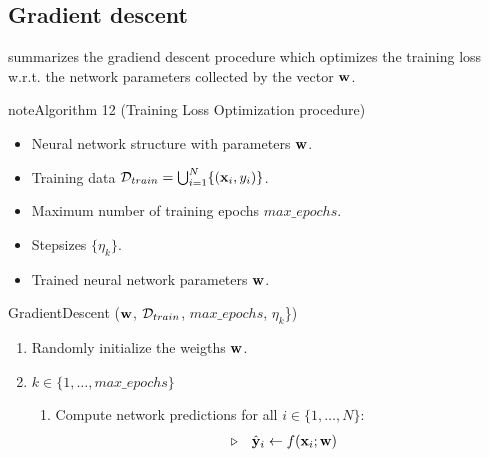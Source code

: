 \documentclass[letterpaper,10pt,english]{jupyterBook}
\begin{document}
\subsection{Gradient descent}
\label{\detokenize{neuralnets_backprop:gradient-descent}}
\sphinxAtStartPar
{\hyperref[\detokenize{neuralnets_backprop:gradient_descent_alg}]{}} summarizes the gradiend descent procedure which optimizes the training loss w.r.t. the network parameters collected by the vector \({\bf w}\).
\label{neuralnets_backprop:gradient_descent_alg}
\begin{sphinxadmonition}{note}{Algorithm 12 (Training Loss Optimization procedure)}



\sphinxAtStartPar
{}
\begin{itemize}
\item {} 
\sphinxAtStartPar
Neural network structure with parameters \({\bf w}\).

\item {} 
\sphinxAtStartPar
Training data \( {\cal D}_{train} = \bigcup_{i=1}^{N} \lbrace \left( {\bf x}_i, y_i \right) \rbrace \).

\item {} 
\sphinxAtStartPar
Maximum number of training epochs \(max\_epochs\).

\item {} 
\sphinxAtStartPar
Step\sphinxhyphen{}sizes \(\lbrace \eta_k \rbrace \).

\end{itemize}

\sphinxAtStartPar
{}
\begin{itemize}
\item {} 
\sphinxAtStartPar
Trained neural network parameters \({\bf w}\).

\end{itemize}

\sphinxAtStartPar
{} GradientDescent (\({\bf w}\), \({\cal D}_{train}\), \(max\_epochs\), \(\eta_k\)\})
\begin{enumerate}
%
\item {} 
\sphinxAtStartPar
Randomly initialize the weigths \({\bf w}\).

\item {} 
\sphinxAtStartPar
{} \(k \in \lbrace 1, \ldots, max\_epochs \rbrace \)
\begin{enumerate}
%
\item {} 
\sphinxAtStartPar
Compute network predictions for all \(i \in \lbrace 1, \ldots, N \rbrace \):
\begin{equation*}
\begin{split} \triangleright \,\,\,\,\,\, \hat{\bf y}_{i} \gets f({\bf x}_{i}; {\bf w})\end{split}
\end{equation*}


\end{enumerate}
\end{enumerate}
\end{sphinxadmonition}
\end{document}
